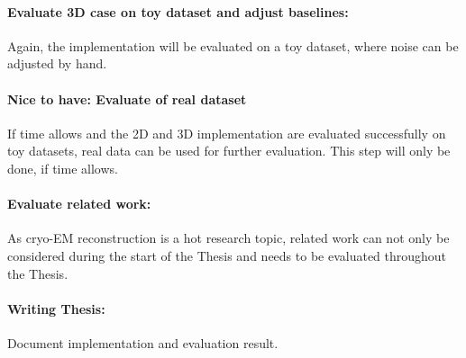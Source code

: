 \paragraph{Evaluate 3D case on toy dataset and adjust baselines:}
Again, the implementation will be evaluated on a toy dataset, where noise can be adjusted by hand.


\paragraph{Nice to have: Evaluate of real dataset}
If time allows and the 2D and 3D implementation are evaluated successfully on toy datasets, 
real data can be used for further evaluation. This step will only be done, if time allows.


\paragraph{Evaluate related work:}
As cryo-EM reconstruction is a hot research topic, related work can not only
be considered during the start of the Thesis and needs to be evaluated throughout the Thesis.

\paragraph{Writing Thesis:}
Document implementation and evaluation result.

